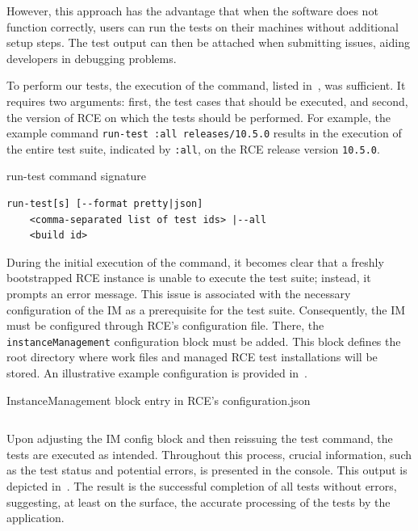 However, this approach has the advantage that when the software does not function correctly, users can run the tests on their machines without additional setup steps. The test output can then be attached when submitting issues, aiding developers in debugging problems.

To perform our tests, the execution of the command, listed in~, was sufficient. It requires two arguments: first, the test cases that should be executed, and second, the version of \ac{RCE} on which the tests should be performed. For example, the example command \texttt{run-test :all releases/10.5.0} results in the execution of the entire test suite, indicated by \texttt{:all}, on the \ac{RCE} release version \texttt{10.5.0}.

\begin{listing}[ht]
\caption{run-test command signature}
\label{lst:run-tests-command}
\begin{verbatim}
run-test[s] [--format pretty|json] 
    <comma-separated list of test ids> |--all
    <build id>
\end{verbatim}
\end{listing}

During the initial execution of the command, it becomes clear that a freshly bootstrapped \ac{RCE} instance is unable to execute the test suite; instead, it prompts an error message. This issue is associated with the necessary configuration of the \ac{IM} as a prerequisite for the test suite. Consequently, the \ac{IM} must be configured through \ac{RCE}'s configuration file. There, the \texttt{instanceManagement} configuration block must be added. This block defines the root directory where work files and managed RCE test installations will be stored. An illustrative example configuration is provided in~.

\begin{listing}[!ht]
\caption{InstanceManagement block entry in \ac{RCE}'s configuration.json}
\label{lst:configuration-json}
\inputminted[linenos, xleftmargin=2em]{json}{files/code/configuration.json}
\end{listing}

Upon adjusting the \ac{IM} config block and then reissuing the test command, the tests are executed as intended. Throughout this process, crucial information, such as the test status and potential errors, is presented in the console. This output is depicted in~. The result is the successful completion of all tests without errors, suggesting, at least on the surface, the accurate processing of the tests by the application.

